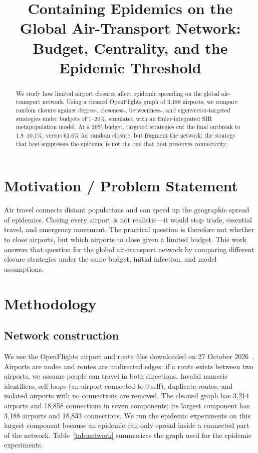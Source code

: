 \documentclass[conference]{IEEEtran}
\title{Containing Epidemics on the Global Air-Transport Network:\\
Budget, Centrality, and the Epidemic Threshold}
\author{
\IEEEauthorblockN{Krish Dhola (202301189), Prince Sojitra (202301126), Jenish Vasani (202301057)}
\IEEEauthorblockA{Group 22}
}
\begin{document}
\maketitle

\begin{abstract}
We study how limited airport closures affect epidemic spreading on the global air-transport network. Using a cleaned OpenFlights graph of 3,188 airports, we compare random closure against degree-, closeness-, betweenness-, and eigenvector-targeted strategies under budgets of 1--20\%, simulated with an Euler-integrated SIR metapopulation model. At a 20\% budget, targeted strategies cut the final outbreak to 1.8--10.1\%, versus 61.6\% for random closure, but fragment the network: the strategy that best suppresses the epidemic is not the one that best preserves connectivity.
\end{abstract}

\section{Motivation / Problem Statement}
Air travel connects distant populations and can speed up the geographic spread of epidemics. Closing every airport is not realistic---it would stop trade, essential travel, and emergency movement. The practical question is therefore not whether to close airports, but which airports to close given a limited budget. This work answers that question for the global air-transport network by comparing different closure strategies under the same budget, initial infection, and model assumptions.~\cite{keeling2005,pastorsatorras2015}

\section{Methodology}
\subsection{Network construction}
We use the OpenFlights airport and route files downloaded on 27 October 2026~\cite{openflights}. Airports are nodes and routes are undirected edges: if a route exists between two airports, we assume people can travel in both directions. Invalid numeric identifiers, self-loops (an airport connected to itself), duplicate routes, and isolated airports with no connections are removed. The cleaned graph has 3,214 airports and 18,858 connections in seven components; its largest component has 3,188 airports and 18,833 connections. We run the epidemic experiments on this largest component because an epidemic can only spread inside a connected part of the network. Table~\ref{tab:network} summarizes the graph used for the epidemic experiments.
\end{document}
